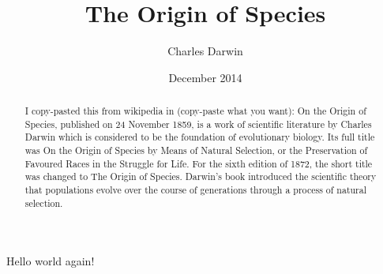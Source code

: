 \documentclass[letterpaper,notitlepage,11pt]{article}
\begin{document}
\title{The Origin of Species}
\author{Charles Darwin}
\date{December 2014}
\maketitle
\begin{abstract}
I copy-pasted this from wikipedia in
(copy-paste what you want):
On the Origin of Species, published on 24 November 1859, is a
work of scientific literature by Charles Darwin which is considered
to be the foundation of evolutionary biology. Its full title was On
the Origin of Species by Means of Natural Selection, or the
Preservation of Favoured Races in the Struggle for Life. For the
sixth edition of 1872, the short title was changed to The Origin of
Species. Darwin’s book introduced the scientific theory that
populations evolve over the course of generations through a process
of natural selection.
\end{abstract}
Hello {\color{red} world} again!
\end{document}
